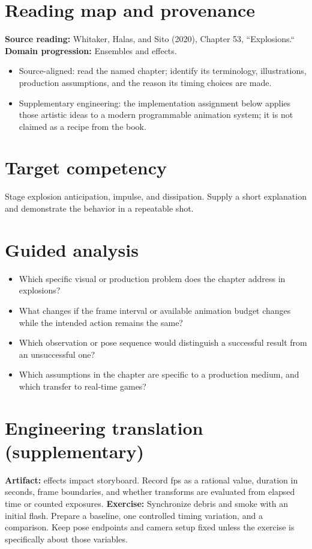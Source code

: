 \documentclass[10pt,letterpaper]{article}
\begin{document}
\makedoctitle
\makedocsummary

\section{Reading map and provenance}
\textbf{Source reading:} Whitaker, Halas, and Sito (2020), Chapter 53, ``Explosions.``\\
\textbf{Domain progression:} Ensembles and effects.
\begin{itemize}
\item Source-aligned: read the named chapter; identify its terminology, illustrations, production assumptions, and the reason its timing choices are made.
\item Supplementary engineering: the implementation assignment below applies those artistic ideas to a modern programmable animation system; it is not claimed as a recipe from the book.
\end{itemize}
\section{Target competency}
Stage explosion anticipation, impulse, and dissipation. Supply a short explanation and demonstrate the behavior in a repeatable shot.
\section{Guided analysis}
\begin{itemize}
\item Which specific visual or production problem does the chapter address in explosions?
\item What changes if the frame interval or available animation budget changes while the intended action remains the same?
\item Which observation or pose sequence would distinguish a successful result from an unsuccessful one?
\item Which assumptions in the chapter are specific to a production medium, and which transfer to real-time games?
\end{itemize}
\section{Engineering translation (supplementary)}
\textbf{Artifact:} effects impact storyboard. Record fps as a rational value, duration in seconds, frame boundaries, and whether transforms are evaluated from elapsed time or counted exposures.
\textbf{Exercise:} Synchronize debris and smoke with an initial flash. Prepare a baseline, one controlled timing variation, and a comparison. Keep pose endpoints and camera setup fixed unless the exercise is specifically about those variables.
\end{document}
